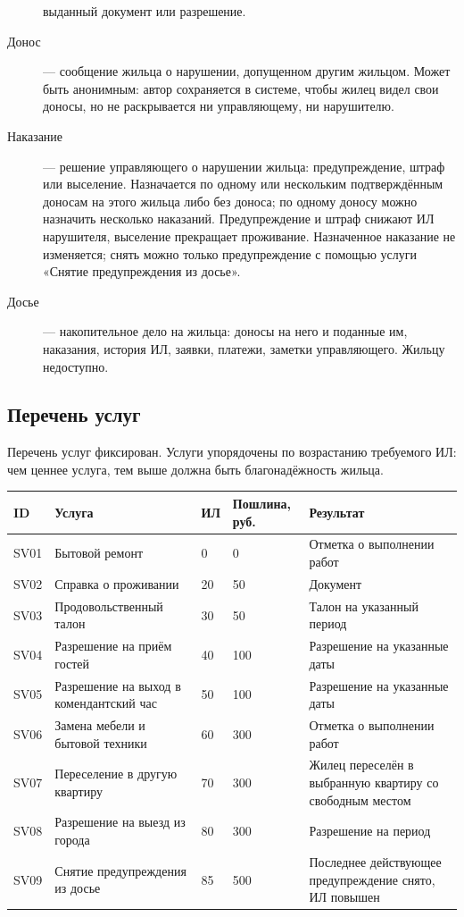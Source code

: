 \documentclass[12pt,a4paper]{article}
\begin{document}
\begin{description}
    выданный документ или разрешение.
  \item[Донос] --- сообщение жильца о нарушении, допущенном другим жильцом.
    Может быть анонимным: автор сохраняется в системе, чтобы жилец видел
    свои доносы, но не раскрывается ни управляющему, ни нарушителю.
  \item[Наказание] --- решение управляющего о нарушении жильца:
    предупреждение, штраф или выселение. Назначается по одному или
    нескольким подтверждённым доносам на этого жильца либо без доноса; по
    одному доносу можно назначить несколько наказаний. Предупреждение и
    штраф снижают ИЛ нарушителя, выселение прекращает проживание.
    Назначенное наказание не изменяется; снять можно только предупреждение
    с помощью услуги «Снятие предупреждения из досье».
  \item[Досье] --- накопительное дело на жильца: доносы на него и поданные
    им, наказания, история ИЛ, заявки, платежи, заметки управляющего.
    Жильцу недоступно.
\end{description}

\subsection{Перечень услуг}

Перечень услуг фиксирован. Услуги упорядочены по возрастанию требуемого ИЛ:
чем ценнее услуга, тем выше должна быть благонадёжность жильца.

\begin{longtable}{L{11mm} L{50mm} L{9mm} L{20mm} L{55mm}}
\toprule
\textbf{ID} & \textbf{Услуга} & \textbf{ИЛ} & \textbf{Пошлина, руб.} & \textbf{Результат} \\
\midrule
\endhead
\bottomrule
\endfoot
SV01 & Бытовой ремонт & 0 & 0 & Отметка о выполнении работ \\
SV02 & Справка о проживании & 20 & 50 & Документ \\
SV03 & Продовольственный талон & 30 & 50 & Талон на указанный период \\
SV04 & Разрешение на приём гостей & 40 & 100 & Разрешение на указанные даты \\
SV05 & Разрешение на выход в комендантский час & 50 & 100 & Разрешение на указанные даты \\
SV06 & Замена мебели и бытовой техники & 60 & 300 & Отметка о выполнении работ \\
SV07 & Переселение в другую квартиру & 70 & 300 & Жилец переселён в выбранную квартиру со свободным местом \\
SV08 & Разрешение на выезд из города & 80 & 300 & Разрешение на период \\
SV09 & Снятие предупреждения из досье & 85 & 500 & Последнее действующее предупреждение снято, ИЛ повышен \\
\end{longtable}
\end{document}
